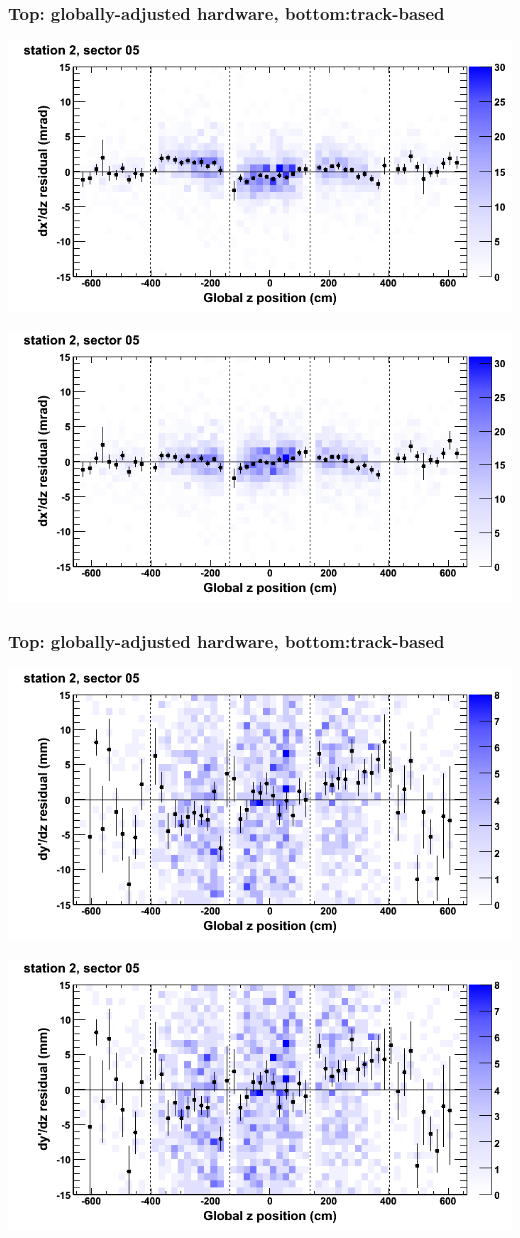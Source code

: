 \documentclass[compress]{beamer}
\begin{document}
\begin{frame}
\frametitle{Top: globally-adjusted hardware, bottom:track-based}
\includegraphics[width=0.7\linewidth]{NOV4_mapplots_HW/DTvsz_st2sec05_dxdz.png}

\includegraphics[width=0.7\linewidth]{NOV4_mapplots/DTvsz_st2sec05_dxdz.png}
\end{frame}

\begin{frame}
\frametitle{Top: globally-adjusted hardware, bottom:track-based}
\includegraphics[width=0.7\linewidth]{NOV4_mapplots_HW/DTvsz_st2sec05_dydz.png}

\includegraphics[width=0.7\linewidth]{NOV4_mapplots/DTvsz_st2sec05_dydz.png}
\end{frame}
\end{document}
